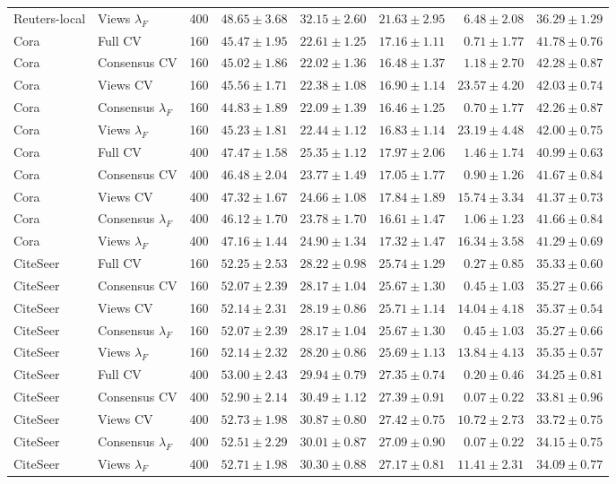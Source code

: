 \begin{longtable}{llrrrrrr}
Reuters-local & Views $\lambda_F$ & 400 & $48.65\pm3.68$ & $32.15\pm2.60$ & $21.63\pm2.95$ & $6.48\pm2.08$ & $36.29\pm1.29$\\
Cora & Full CV & 160 & $45.47\pm1.95$ & $22.61\pm1.25$ & $17.16\pm1.11$ & $0.71\pm1.77$ & $41.78\pm0.76$\\
Cora & Consensus CV & 160 & $45.02\pm1.86$ & $22.02\pm1.36$ & $16.48\pm1.37$ & $1.18\pm2.70$ & $42.28\pm0.87$\\
Cora & Views CV & 160 & $45.56\pm1.71$ & $22.38\pm1.08$ & $16.90\pm1.14$ & $23.57\pm4.20$ & $42.03\pm0.74$\\
Cora & Consensus $\lambda_F$ & 160 & $44.83\pm1.89$ & $22.09\pm1.39$ & $16.46\pm1.25$ & $0.70\pm1.77$ & $42.26\pm0.87$\\
Cora & Views $\lambda_F$ & 160 & $45.23\pm1.81$ & $22.44\pm1.12$ & $16.83\pm1.14$ & $23.19\pm4.48$ & $42.00\pm0.75$\\
Cora & Full CV & 400 & $47.47\pm1.58$ & $25.35\pm1.12$ & $17.97\pm2.06$ & $1.46\pm1.74$ & $40.99\pm0.63$\\
Cora & Consensus CV & 400 & $46.48\pm2.04$ & $23.77\pm1.49$ & $17.05\pm1.77$ & $0.90\pm1.26$ & $41.67\pm0.84$\\
Cora & Views CV & 400 & $47.32\pm1.67$ & $24.66\pm1.08$ & $17.84\pm1.89$ & $15.74\pm3.34$ & $41.37\pm0.73$\\
Cora & Consensus $\lambda_F$ & 400 & $46.12\pm1.70$ & $23.78\pm1.70$ & $16.61\pm1.47$ & $1.06\pm1.23$ & $41.66\pm0.84$\\
Cora & Views $\lambda_F$ & 400 & $47.16\pm1.44$ & $24.90\pm1.34$ & $17.32\pm1.47$ & $16.34\pm3.58$ & $41.29\pm0.69$\\
CiteSeer & Full CV & 160 & $52.25\pm2.53$ & $28.22\pm0.98$ & $25.74\pm1.29$ & $0.27\pm0.85$ & $35.33\pm0.60$\\
CiteSeer & Consensus CV & 160 & $52.07\pm2.39$ & $28.17\pm1.04$ & $25.67\pm1.30$ & $0.45\pm1.03$ & $35.27\pm0.66$\\
CiteSeer & Views CV & 160 & $52.14\pm2.31$ & $28.19\pm0.86$ & $25.71\pm1.14$ & $14.04\pm4.18$ & $35.37\pm0.54$\\
CiteSeer & Consensus $\lambda_F$ & 160 & $52.07\pm2.39$ & $28.17\pm1.04$ & $25.67\pm1.30$ & $0.45\pm1.03$ & $35.27\pm0.66$\\
CiteSeer & Views $\lambda_F$ & 160 & $52.14\pm2.32$ & $28.20\pm0.86$ & $25.69\pm1.13$ & $13.84\pm4.13$ & $35.35\pm0.57$\\
CiteSeer & Full CV & 400 & $53.00\pm2.43$ & $29.94\pm0.79$ & $27.35\pm0.74$ & $0.20\pm0.46$ & $34.25\pm0.81$\\
CiteSeer & Consensus CV & 400 & $52.90\pm2.14$ & $30.49\pm1.12$ & $27.39\pm0.91$ & $0.07\pm0.22$ & $33.81\pm0.96$\\
CiteSeer & Views CV & 400 & $52.73\pm1.98$ & $30.87\pm0.80$ & $27.42\pm0.75$ & $10.72\pm2.73$ & $33.72\pm0.75$\\
CiteSeer & Consensus $\lambda_F$ & 400 & $52.51\pm2.29$ & $30.01\pm0.87$ & $27.09\pm0.90$ & $0.07\pm0.22$ & $34.15\pm0.75$\\
CiteSeer & Views $\lambda_F$ & 400 & $52.71\pm1.98$ & $30.30\pm0.88$ & $27.17\pm0.81$ & $11.41\pm2.31$ & $34.09\pm0.77$\\
\end{longtable}
\endgroup
